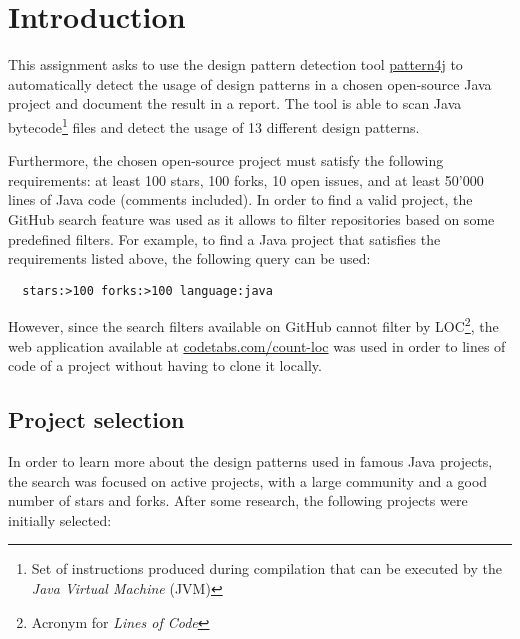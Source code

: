 \section{Introduction}

This assignment asks to use the design pattern detection tool \href{https://users.encs.concordia.ca/~nikolaos/pattern\_detection.html}{pattern4j} to automatically detect the usage of design patterns in a chosen open-source Java project and document the result in a report. The tool is able to scan Java bytecode\footnote{Set of instructions produced during compilation that can be executed by the \textit{Java Virtual Machine} (JVM)} files and detect the usage of 13 different design patterns.

Furthermore, the chosen open-source project must satisfy the following requirements: at least 100 stars, 100 forks, 10 open issues, and at least 50'000 lines of Java code (comments included). In order to find a valid project, the GitHub search feature was used as it allows to filter repositories based on some predefined filters. For example, to find a Java project that satisfies the requirements listed above, the following query can be used:

\begin{verbatim}
  stars:>100 forks:>100 language:java
\end{verbatim}

\noindent However, since the search filters available on GitHub cannot filter by LOC\footnote{Acronym for \textit{Lines of Code}}, the web application available at \href{https://codetabs.com/count-loc/count-loc-online.html}{codetabs.com/count-loc} was used in order to lines of code of a project without having to clone it locally.

\subsection{Project selection}

In order to learn more about the design patterns used in famous Java projects, the search was focused on active projects, with a large community and a good number of stars and forks. After some research, the following projects were initially selected:

